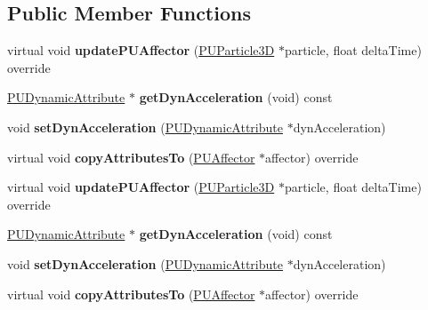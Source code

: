 \subsection*{Public Member Functions}
\begin{DoxyCompactItemize}
\item 
\mbox{\label{classPUJetAffector_a06878843973c835589b52772e4fe4529}} 
virtual void {\bfseries update\+P\+U\+Affector} (\hyperlink{structPUParticle3D}{P\+U\+Particle3D} $\ast$particle, float delta\+Time) override
\item 
\mbox{\label{classPUJetAffector_aa149ffde0e1430a1f7fb5f4321528335}} 
\hyperlink{classPUDynamicAttribute}{P\+U\+Dynamic\+Attribute} $\ast$ {\bfseries get\+Dyn\+Acceleration} (void) const
\item 
\mbox{\label{classPUJetAffector_a10d108918afde1acbf02c9cfb066e691}} 
void {\bfseries set\+Dyn\+Acceleration} (\hyperlink{classPUDynamicAttribute}{P\+U\+Dynamic\+Attribute} $\ast$dyn\+Acceleration)
\item 
\mbox{\label{classPUJetAffector_adc815229d6ad66c6d1af617fda0188d7}} 
virtual void {\bfseries copy\+Attributes\+To} (\hyperlink{classPUAffector}{P\+U\+Affector} $\ast$affector) override
\item 
\mbox{\label{classPUJetAffector_a1e26908ec636ebe16c13fe868cd32006}} 
virtual void {\bfseries update\+P\+U\+Affector} (\hyperlink{structPUParticle3D}{P\+U\+Particle3D} $\ast$particle, float delta\+Time) override
\item 
\mbox{\label{classPUJetAffector_aa149ffde0e1430a1f7fb5f4321528335}} 
\hyperlink{classPUDynamicAttribute}{P\+U\+Dynamic\+Attribute} $\ast$ {\bfseries get\+Dyn\+Acceleration} (void) const
\item 
\mbox{\label{classPUJetAffector_a10d108918afde1acbf02c9cfb066e691}} 
void {\bfseries set\+Dyn\+Acceleration} (\hyperlink{classPUDynamicAttribute}{P\+U\+Dynamic\+Attribute} $\ast$dyn\+Acceleration)
\item 
\mbox{\label{classPUJetAffector_a7ae9d677b05e6ad1672395151cc55087}} 
virtual void {\bfseries copy\+Attributes\+To} (\hyperlink{classPUAffector}{P\+U\+Affector} $\ast$affector) override
\end{DoxyCompactItemize}

